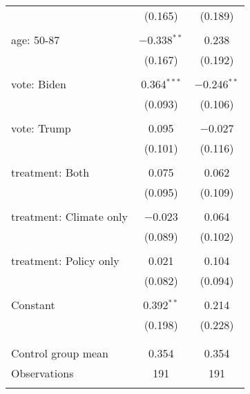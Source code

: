 \begin{tabular}{@{\extracolsep{5pt}}lcc}
  & (0.165) & (0.189) \\ 
  & & \\ 
 age: 50-87 & $-$0.338$^{**}$ & 0.238 \\ 
  & (0.167) & (0.192) \\ 
  & & \\ 
 vote: Biden & 0.364$^{***}$ & $-$0.246$^{**}$ \\ 
  & (0.093) & (0.106) \\ 
  & & \\ 
 vote: Trump & 0.095 & $-$0.027 \\ 
  & (0.101) & (0.116) \\ 
  & & \\ 
 treatment: Both & 0.075 & 0.062 \\ 
  & (0.095) & (0.109) \\ 
  & & \\ 
 treatment: Climate only & $-$0.023 & 0.064 \\ 
  & (0.089) & (0.102) \\ 
  & & \\ 
 treatment: Policy only & 0.021 & 0.104 \\ 
  & (0.082) & (0.094) \\ 
  & & \\ 
 Constant & 0.392$^{**}$ & 0.214 \\ 
  & (0.198) & (0.228) \\ 
  & & \\ 
\hline \\[-1.8ex] 
Control group mean & 0.354 & 0.354 \\ 
Observations & 191 & 191 \\ 
\hline 
\hline \\[-1.8ex] 
\end{tabular} 
